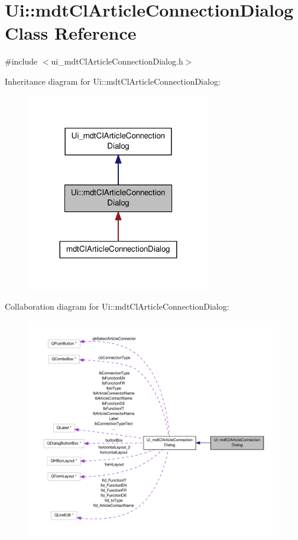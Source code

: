 \hypertarget{class_ui_1_1mdt_cl_article_connection_dialog}{\section{Ui\-:\-:mdt\-Cl\-Article\-Connection\-Dialog Class Reference}
\label{class_ui_1_1mdt_cl_article_connection_dialog}
}


{\ttfamily \#include $<$ui\-\_\-mdt\-Cl\-Article\-Connection\-Dialog.\-h$>$}



Inheritance diagram for Ui\-:\-:mdt\-Cl\-Article\-Connection\-Dialog\-:\nopagebreak
\begin{figure}[H]
\begin{center}
\leavevmode
\includegraphics[width=228pt]{class_ui_1_1mdt_cl_article_connection_dialog__inherit__graph}
\end{center}
\end{figure}


Collaboration diagram for Ui\-:\-:mdt\-Cl\-Article\-Connection\-Dialog\-:\nopagebreak
\begin{figure}[H]
\begin{center}
\leavevmode
\includegraphics[width=350pt]{class_ui_1_1mdt_cl_article_connection_dialog__coll__graph}
\end{center}
\end{figure}
